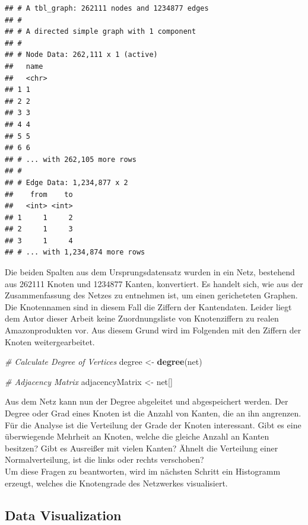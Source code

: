 \documentclass[
  12 pt,
]{article}
\newenvironment{Shaded}{\begin{snugshade}}{\end{snugshade}}
\newcommand{\CommentTok}[1]{\textcolor[rgb]{0.56,0.35,0.01}{\textit{#1}}}
\newcommand{\KeywordTok}[1]{\textcolor[rgb]{0.13,0.29,0.53}{\textbf{#1}}}
\newcommand{\NormalTok}[1]{#1}
\newcommand{\StringTok}[1]{\textcolor[rgb]{0.31,0.60,0.02}{#1}}
\begin{document}
\begin{verbatim}
## # A tbl_graph: 262111 nodes and 1234877 edges
## #
## # A directed simple graph with 1 component
## #
## # Node Data: 262,111 x 1 (active)
##   name 
##   <chr>
## 1 1    
## 2 2    
## 3 3    
## 4 4    
## 5 5    
## 6 6    
## # ... with 262,105 more rows
## #
## # Edge Data: 1,234,877 x 2
##    from    to
##   <int> <int>
## 1     1     2
## 2     1     3
## 3     1     4
## # ... with 1,234,874 more rows
\end{verbatim}

Die beiden Spalten aus dem Ursprungsdatensatz wurden in ein Netz,
bestehend aus 262111 Knoten und 1234877 Kanten, konvertiert. Es handelt
sich, wie aus der Zusammenfassung des Netzes zu entnehmen ist, um einen
gericheteten Graphen. Die Knotennamen sind in diesem Fall die Ziffern
der Kantendaten. Leider liegt dem Autor dieser Arbeit keine
Zuordnungsliste von Knotenziffern zu realen Amazonprodukten vor. Aus
diesem Grund wird im Folgenden mit den Ziffern der Knoten
weitergearbeitet.\\

\begin{Shaded}
\begin{Highlighting}[]
\CommentTok{# Calculate Degree of Vertices}
\NormalTok{degree <-}\StringTok{ }\KeywordTok{degree}\NormalTok{(net)}

\CommentTok{# Adjacency Matrix}
\NormalTok{adjacencyMatrix <-}\StringTok{ }\NormalTok{net[]}
\end{Highlighting}
\end{Shaded}

Aus dem Netz kann nun der Degree abgeleitet und abgespeichert werden.
Der Degree oder Grad eines Knoten ist die Anzahl von Kanten, die an ihn
angrenzen. Für die Analyse ist die Verteilung der Grade der Knoten
interessant. Gibt es eine überwiegende Mehrheit an Knoten, welche die
gleiche Anzahl an Kanten besitzen? Gibt es Ausreißer mit vielen Kanten?
Ähnelt die Verteilung einer Normalverteilung, ist die links oder rechts
verschoben?\\
Um diese Fragen zu beantworten, wird im nächsten Schritt ein Histogramm
erzeugt, welches die Knotengrade des Netzwerkes visualisiert.\\

\hypertarget{data-visualization}{%
\subsection{Data Visualization}\label{data-visualization}}
\end{document}
